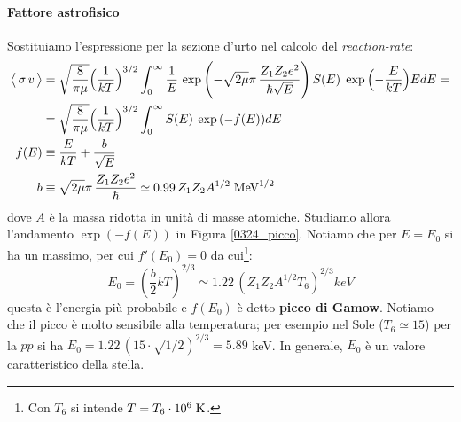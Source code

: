 \paragraph{Fattore astrofisico} 
Sostituiamo l'espressione per la sezione d'urto nel calcolo del \textit{reaction-rate}:
\begin{align*}
\bigl\langle\, \sigma\, v \, \bigr\rangle &= \sqrt{\frac{8}{\pi\mu}} \Bigl ( \frac{1}{kT} \Bigr )^{3/2} \int_0^\infty \frac{1}{E}\,\exp{\Biggl ( -\sqrt{2\mu}\pi\, \frac{Z_1Z_2 e^2}{\hbar \sqrt{E}} \Biggr )}\, S(E) \; \exp{\Bigl ( -\frac{E}{kT} \Bigr )} E dE = \\
&= \sqrt{\frac{8}{\pi\mu}} \Bigl ( \frac{1}{kT} \Bigr )^{3/2} \int_0^\infty S(E) \: \exp{(-f(E))} dE\\
f(E) &\equiv \frac{E}{kT} + \frac{b}{\sqrt{E}}\\
b &\equiv \sqrt{2\mu}\pi\, \frac{Z_1Z_2 e^2}{\hbar} \simeq 0.99 \, Z_1 Z_2 A^{1/2} \;\mbox{MeV}^{1/2}
\end{align*}
\noindent dove $A$ è la massa ridotta in unità di masse atomiche. Studiamo allora l'andamento $\exp{(-f(E))}$ in Figura \ref{0324_picco}. Notiamo che per $E=E_0$ si ha un massimo, per cui $f'(E_0) = 0$ da cui\footnote{Con $T_6$ si intende $T = T_6 \cdot 10^{6}\;\mbox{K}$.}: 
$$E_0 = (\frac{b}{2}kT)^{2/3} \simeq 1.22 \, (Z_1Z_2 A^{1/2} T_6)^{2/3}\unit{keV} $$
questa è l'energia più probabile e $f(E_0)$ è detto \textbf{picco di Gamow}. Notiamo che il picco è molto sensibile alla temperatura; per esempio nel Sole ($T_6\simeq 15$) per la $pp$ si ha $E_0 = 1.22\, (15\cdot \sqrt{1/2})^{2/3} = 5.89$ keV. In generale, $E_0$ è un valore caratteristico della stella.
